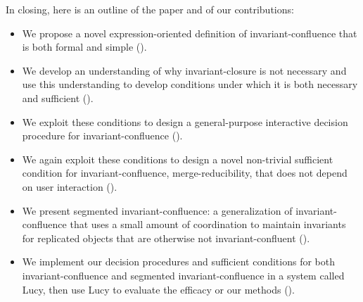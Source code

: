 In closing, here is an outline of the paper and of our contributions:
\begin{itemize}
  \item
    We propose a novel expression-oriented definition of invariant-confluence
    that is both formal and simple ().

  \item
    We develop an understanding of why invariant-closure is not necessary and
    use this understanding to develop conditions under which it is both
    necessary and sufficient ().

  \item
    We exploit these conditions to design a general-purpose interactive
    decision procedure for invariant-confluence
    ().

  \item
    We again exploit these conditions to design a novel non-trivial sufficient
    condition for invariant-confluence, merge-reducibility, that does not
    depend on user interaction ().

  \item
    We present segmented invariant-confluence: a generalization of
    invariant-confluence that uses a small amount of coordination to maintain
    invariants for replicated objects that are otherwise not
    invariant-confluent ().

  \item
    We implement our decision procedures and sufficient conditions for both
    invariant-confluence and segmented invariant-confluence in a system called
    Lucy, then use Lucy to evaluate the efficacy or our methods
    ().
\end{itemize}
